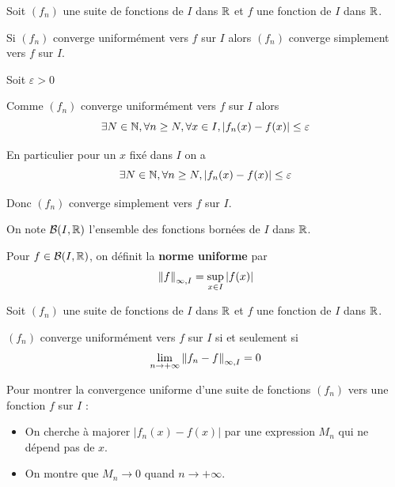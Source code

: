 \documentclass[a4paper,12pt]{article}
\begin{document}
\begin{proposition}{}{}
    Soit $(f_n)$ une suite de fonctions de $I$ dans $\mathbb{R}$ et $f$ une fonction de $I$ dans $\mathbb{R}$.

    Si $(f_n)$ converge uniformément vers $f$ sur $I$ alors $(f_n)$ converge simplement vers $f$ sur $I$.
\end{proposition}

\begin{demonstration}
    Soit $\varepsilon > 0$

    Comme $(f_n)$ converge uniformément vers $f$ sur $I$ alors
    $$
    \exists N \in \mathbb{N}, \forall n \geq N, \forall x \in I, |f_n(x) - f(x)| \leq \varepsilon
    $$

    En particulier pour un $x$ fixé dans $I$ on a
    $$
    \exists N \in \mathbb{N}, \forall n \geq N, |f_n(x) - f(x)| \leq \varepsilon
    $$

    Donc $(f_n)$ converge simplement vers $f$ sur $I$.
\end{demonstration}

\begin{definition}
    On note $\mathcal{B}(I, \mathbb{R})$ l'ensemble des fonctions bornées de $I$ dans $\mathbb{R}$.
    
    Pour $f \in \mathcal{B}(I, \mathbb{R})$, on définit la \textbf{norme uniforme} par
    $$
    \left\lVert f\right\rVert_{\infty, I} = \sup_{x \in I} |f(x)|
    $$
\end{definition}

\begin{definition}
    Soit $(f_n)$ une suite de fonctions de $I$ dans $\mathbb{R}$ et $f$ une fonction de $I$ dans $\mathbb{R}$.

    $(f_n)$ converge uniformément vers $f$ sur $I$ si et seulement si
    $$
    \lim\limits_{n \to +\infty} \left\lVert f_n - f\right\rVert_{\infty, I} = 0
    $$
\end{definition}

\vspace{0.5cm}

\begin{methode}
    Pour montrer la convergence uniforme d'une suite de fonctions $(f_n)$ vers une fonction $f$ sur $I$ :
    \begin{itemize}[label=--]
        \item On cherche à majorer $|f_n(x) - f(x)|$ par une expression $M_n$ qui ne dépend pas de $x$.
        \item On montre que $M_n \to 0$ quand $n \to +\infty$.
    \end{itemize}
\end{methode}
\end{document}
